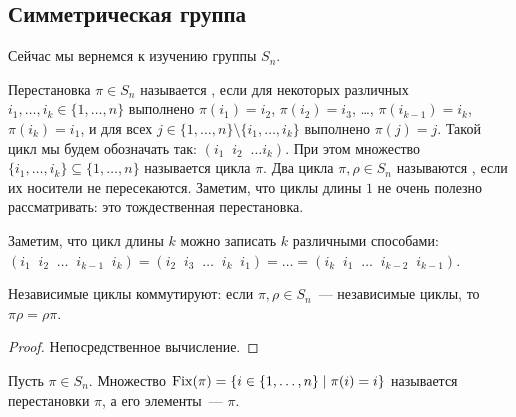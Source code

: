 \subsection{Симметрическая группа}


Сейчас мы вернемся к изучению группы $S_n$.

\begin{definition}
Перестановка $\pi\in S_n$ называется
, если для
некоторых различных $i_1,\dots,i_k\in\{1,\dots,n\}$ выполнено
$\pi(i_1) = i_2$, $\pi(i_2) = i_3$, \dots, $\pi(i_{k-1}) = i_k$,
$\pi(i_k) = i_1$, и для всех
$j\in\{1,\dots,n\}\setminus\{i_1,\dots,i_k\}$ выполнено $\pi(j)=j$.
Такой цикл мы будем обозначать так:
$(i_1\;\;i_2\;\;\dots i_k)$.
При этом множество $\{i_1,\dots,i_k\}\subseteq\{1,\dots,n\}$
называется  цикла $\pi$.
Два цикла $\pi,\rho\in S_n$ называются
, если их носители не
пересекаются. Заметим, что циклы длины $1$ не очень полезно
рассматривать: это тождественная перестановка.
\end{definition}

\begin{remark}\label{rem:different_notations_cycle}
Заметим, что цикл длины $k$ можно записать $k$ различными способами:
$(i_1\;\;i_2\;\;\dots\;\;i_{k-1}\;\;i_k) = 
(i_2\;\;i_3\;\;\dots\;\;i_k\;\;i_1) = \dots =
(i_k\;\;i_1\;\;\dots\;\;i_{k-2}\;\;i_{k-1})$.
\end{remark}

\begin{lemma}
Независимые циклы коммутируют: если $\pi,\rho\in S_n$~--- независимые
циклы, то $\pi\rho = \rho\pi$.
\end{lemma}
\begin{proof}
Непосредственное вычисление.
\end{proof}

\begin{definition}
Пусть $\pi\in S_n$. Множество $\operatorname{Fix}(\pi) = \{i\in\{1,\dots,n\}\mid
\pi(i)=i\}$ называется  перестановки $\pi$, а его
элементы~---  $\pi$.
\end{definition}

